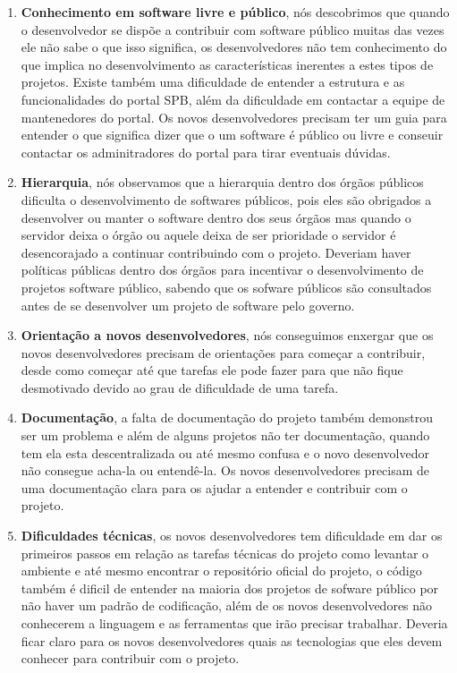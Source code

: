 \begin{enumerate}
\item \textbf{Conhecimento em software livre e público}, nós descobrimos que quando
o desenvolvedor se dispõe a contribuir com software público muitas das vezes ele
não sabe o que isso significa, os desenvolvedores não
tem conhecimento do que implica no desenvolvimento as características inerentes
a estes tipos de projetos. Existe também uma dificuldade de entender a estrutura
e as funcionalidades do portal SPB, além da dificuldade em contactar a equipe de 
mantenedores do portal. Os novos desenvolvedores precisam ter um guia para entender
o que significa dizer que o um software é público ou livre e conseuir contactar os
adminitradores do portal para tirar eventuais dúvidas.

\item \textbf{Hierarquia}, nós observamos que a hierarquia dentro dos órgãos públicos 
dificulta o desenvolvimento de softwares públicos, pois eles são obrigados a desenvolver
ou manter o software dentro dos seus órgãos mas quando o servidor deixa o órgão ou aquele 
deixa de ser prioridade o servidor é desencorajado a continuar contribuindo com o projeto.
Deveriam haver políticas públicas dentro dos órgãos para incentivar o desenvolvimento de 
projetos software público, sabendo que os sofware públicos são consultados antes de se
desenvolver um projeto de software pelo governo. 

\item \textbf{Orientação a novos desenvolvedores}, nós conseguimos enxergar que os 
novos desenvolvedores precisam de orientações para começar a contribuir, desde como
começar até que tarefas ele pode fazer para que não fique desmotivado devido ao grau
de dificuldade de uma tarefa.

\item \textbf{Documentação}, a falta de documentação do projeto também demonstrou ser um
problema e além de alguns projetos não ter documentação, quando tem ela esta descentralizada 
ou até mesmo confusa e o novo desenvolvedor não consegue acha-la ou entendê-la. Os novos 
desenvolvedores precisam de uma documentação clara para os ajudar a entender e contribuir
com o projeto.

\item \textbf{Dificuldades técnicas}, os novos desenvolvedores tem dificuldade em dar os
primeiros passos em relação as tarefas técnicas do projeto como levantar o ambiente e até
mesmo encontrar o repositório oficial do projeto, o código também é dificil de entender
na maioria dos projetos de sofware público por não haver um padrão de codificação, além de 
os novos desenvolvedores não conhecerem a linguagem e as ferramentas que irão precisar trabalhar.
Deveria ficar claro para os novos desenvolvedores quais as tecnologias que eles 
devem conhecer para contribuir com o projeto.


\end{enumerate}
